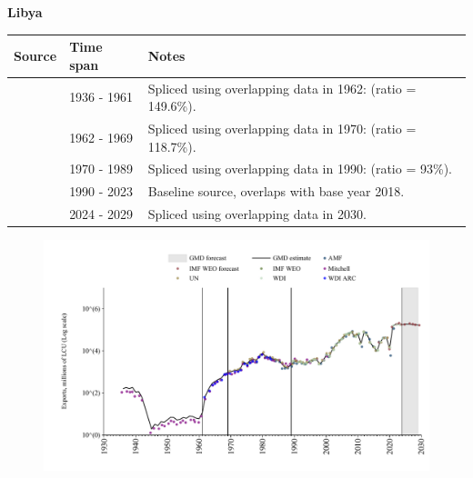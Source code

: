 \documentclass[12pt,a4paper,landscape]{article}
\begin{document}
\begin{adjustbox}{max totalsize={\paperwidth}{\paperheight},center}
\begin{minipage}[t][\textheight][t]{\textwidth}
\vspace*{0.5cm}
{}
\begin{center}
{\Large\bfseries Libya}
\end{center}
\vspace{0.5cm}
\begin{table}[H]
\centering
\small
\begin{tabular}{|l|l|l|}
\hline
\textbf{Source} & \textbf{Time span} & \textbf{Notes} \\
\hline
\rowcolor{white}\cite{Mitchell}& 1936 - 1961 &Spliced using overlapping data in 1962: (ratio = 149.6\%).\\
\rowcolor{lightgray}\cite{WDI_ARC}& 1962 - 1969 &Spliced using overlapping data in 1970: (ratio = 118.7\%).\\
\rowcolor{white}\cite{UN}& 1970 - 1989 &Spliced using overlapping data in 1990: (ratio = 93\%).\\
\rowcolor{lightgray}\cite{WDI}& 1990 - 2023 &Baseline source, overlaps with base year 2018.\\
\rowcolor{white}\cite{IMF_WEO_forecast}& 2024 - 2029 &Spliced using overlapping data in 2030.\\
\hline
\end{tabular}
\end{table}
\begin{figure}[H]
\centering
\includegraphics[width=\textwidth,height=0.6\textheight,keepaspectratio]{graphs/LBY_exports.pdf}
\end{figure}
\end{minipage}
\end{adjustbox}
\end{document}
